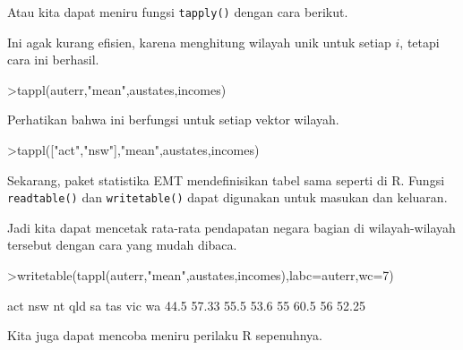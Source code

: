 \documentclass[a4paper,11pt,oneside,enabledeprecatedfontcommands]{scrbook}
\newenvironment{eulernotebook}{}{}
\newenvironment{eulercomment}{\par\medskip\noindent}{\par\medskip}
\begin{document}
\begin{eulernotebook}
\begin{eulercomment}
			Atau kita dapat meniru fungsi \texttt{tapply()} dengan cara berikut.
		\end{eulercomment}
		\begin{eulercomment}
			Ini agak kurang efisien, karena menghitung wilayah unik untuk setiap $i$, tetapi cara ini berhasil.
		\end{eulercomment}
		\begin{eulerprompt}
			>tappl(auterr,"mean",austates,incomes)
		\end{eulerprompt}
		\begin{euleroutput}
			[44.5,  57.3333333333,  55.5,  53.6,  55,  60.5,  56,  52.25]
		\end{euleroutput}
		\begin{eulercomment}
			Perhatikan bahwa ini berfungsi untuk setiap vektor wilayah.
		\end{eulercomment}
		\begin{eulerprompt}
			>tappl(["act","nsw"],"mean",austates,incomes)
		\end{eulerprompt}
		\begin{euleroutput}
			[44.5,  57.3333333333]
		\end{euleroutput}
		\begin{eulercomment}
			Sekarang, paket statistika EMT mendefinisikan tabel sama seperti di R. Fungsi \texttt{readtable()} dan
			\texttt{writetable()} dapat digunakan untuk masukan dan keluaran.
			
			Jadi kita dapat mencetak rata-rata pendapatan negara bagian di wilayah-wilayah tersebut dengan cara
			yang mudah dibaca.
		\end{eulercomment}
		\begin{eulerprompt}
			>writetable(tappl(auterr,"mean",austates,incomes),labc=auterr,wc=7)
		\end{eulerprompt}
		\begin{euleroutput}
			    act    nsw     nt    qld     sa    tas    vic     wa
			   44.5  57.33   55.5   53.6     55   60.5     56  52.25
		\end{euleroutput}
		\begin{eulercomment}
			Kita juga dapat mencoba meniru perilaku R sepenuhnya.
			

\end{eulercomment}
\end{eulernotebook}
\end{document}
